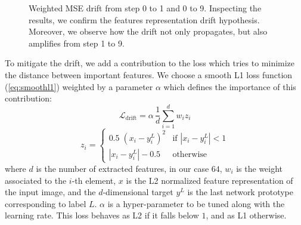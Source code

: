 \documentclass[10pt,twocolumn,letterpaper]{article}
\begin{document}
\begin{figure}
\begin{center}
\end{center}
\caption{Weighted MSE drift from step 0 to 1 and 0 to 9. Inspecting the results, we confirm the features representation drift hypothesis. Moreover, we observe how the drift not only propagates, but also amplifies from step 1 to 9.}
\label{5:histogram}
\end{figure}

To mitigate the drift, we add a contribution to the loss which tries to minimize the distance between important features. We choose a smooth L1 loss function (\ref{eq:smoothl1}) weighted by a parameter $\alpha$ which defines the importance of this contribution:
\begin{equation}
\mathcal{L}_{\text{drift}} = \alpha \, \frac{1}{d} \sum_{i=1}^{d} w_i z_i \label{eq:smoothl1}
\end{equation}
\[
    z_i =
    \begin{cases}
    0.5 \; (x_i - y^L_i)^2 & \text{if } |x_i - y^L_i| < 1 \\
    |x_i - y^L_i| - 0.5 & \text{otherwise}
    \end{cases}
\]
where $d$ is the number of extracted features, in our case $64$, $w_i$ is the weight associated to the $i$-th element, $x$ is the L2 normalized feature representation of the input image, and the $d$-dimensional target $y^L$ is the last network prototype corresponding to label $L$. $\alpha$ is a hyper-parameter to be tuned along with the learning rate. This loss behaves as L2 if it falls below $1$, and as L1 otherwise.
\end{document}
